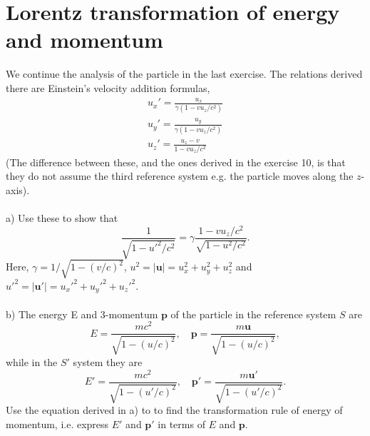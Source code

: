 \documentclass{article}
\begin{document}
    \section{Lorentz transformation of energy and momentum}
    We continue the analysis of the particle in the last exercise. The relations derived there are Einstein's velocity addition formulas,
    \begin{align*}
        u_x' = \frac{u_x}{\gamma(1 - v u_z/c^2)} \\
        u_y' = \frac{u_y}{\gamma(1 - v u_z/c^2)} \\
        u_z' = \frac{u_z - v}{1 - v u_z/c^2}
    \end{align*}
    (The difference between these, and the ones derived in the exercise 10, is that they do not assume the third reference system e.g. the particle moves along the $z$-axis). \\ \\
    a) Use these to show that
    \begin{equation*}
        \frac{1}{\sqrt{1 - u'^2/c^2}} = \gamma \frac{1 - v u_z / c^2}{\sqrt{1 - u^2/c^2}}.
    \end{equation*}
    Here, $\gamma = 1 / \sqrt{1 - (v/c)^2}$, $u^2= |\mathbf{u}| = u_x^2 + u_y^2 + u_z^2$ and $u'^2= |\mathbf{u}'|= u_x'^2 + u_y'^2 + u_z'^2$. \\ \\
    b) The energy E and 3-momentum $\mathbf{p}$ of the particle in the reference system $S$ are
    \begin{equation*}
        E = \frac{mc^2}{\sqrt{1 - (u/c)^2}}, \quad \mathbf{p} =\frac{m\mathbf{u}}{\sqrt{1 - (u/c)^2}},
    \end{equation*}
    while in the $S'$ system they are
    \begin{equation*}
        E' = \frac{mc^2}{\sqrt{1 - (u'/c)^2}}, \quad \mathbf{p'} =\frac{m\mathbf{u'}}{\sqrt{1 - (u'/c)^2}}.
    \end{equation*}
    Use the equation derived in a) to to find the transformation rule of energy of momentum, i.e. express $E'$ and $\mathbf{p}'$ in terms of $E$ and $\mathbf{p}$.
\end{document}
